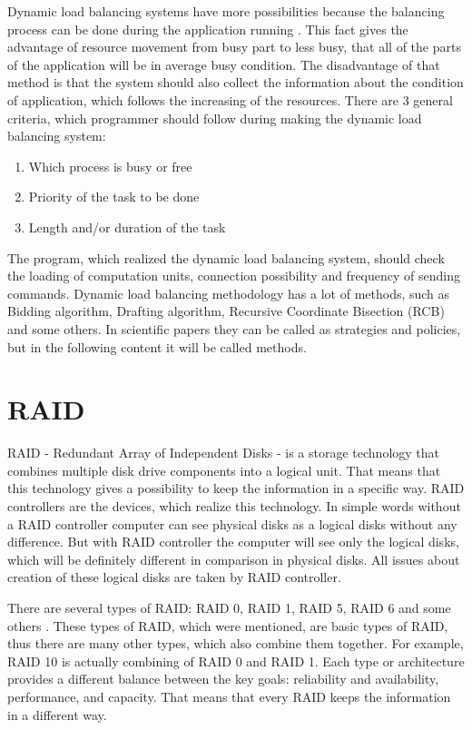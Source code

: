 Dynamic load balancing systems have more possibilities because the balancing process can be done during the application running \cite{guide_dyn_bal}. This fact gives the advantage of resource movement from busy part to less busy, that all of the parts of the application will be in average busy condition. The disadvantage of that method is that the system should also collect the information about the condition of application, which follows the increasing of the resources. There are 3 general criteria, which programmer should follow during making the dynamic load balancing system:
\begin{enumerate}%
	\setlength{\itemsep}{-2mm}
	\item Which process is busy or free 
	\item Priority of the task to be done 
	\item Length and/or duration of the task
\end{enumerate}
The program, which realized the dynamic load balancing system, should check the loading of computation units, connection possibility and frequency of sending commands. Dynamic load balancing methodology has a lot of methods, such as Bidding algorithm, Drafting algorithm, Recursive Coordinate Bisection (RCB) and some others. In scientific papers they can be called as strategies and policies, but in the following content it will be called methods.



\section{RAID}
RAID - Redundant Array of Independent Disks - is a storage technology that combines multiple disk drive components into a logical unit. That means that this technology gives a possibility to keep the information in a specific way. RAID controllers are the devices, which realize this technology. In simple words without a RAID controller computer can see physical disks as a logical disks without any difference. But with RAID controller the computer will see only the logical disks, which will be definitely different in comparison in physical disks. All issues about creation of these logical disks are taken by RAID controller.

There are several types of RAID: RAID 0, RAID 1, RAID 5, RAID 6 and some others \cite{which_raid}. These types of RAID, which were mentioned, are basic types of RAID, thus there are many other types, which also combine them together. For example, RAID 10 is actually combining of RAID 0 and RAID 1. Each type or architecture provides a different balance between the key goals: reliability and availability, performance, and capacity. That means that every RAID keeps the information in a different way. 

